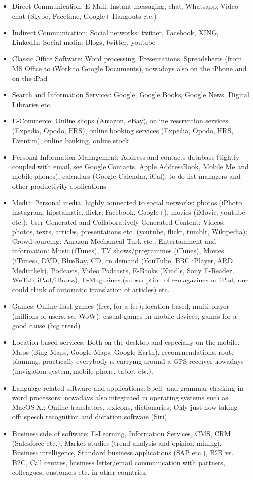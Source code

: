 \begin{multicols}{2}
\begin{itemize}
\item Direct Communication: E-Mail; Instant messaging, chat, Whatsapp; Video chat (Skype, Facetime, Google+ Hangouts etc.)
\item Indirect Communication: Social networks: twitter, Facebook, XING, LinkedIn; Social media: Blogs, twitter, youtube
\item Classic Office Software: Word processing, Presentations, Spreadsheets (from MS Office to iWork to Google Documents), nowadays also on the iPhone and on the iPad
\item Search and Information Services: Google, Google Books, Google News, Digital Libraries etc.
\item E-Commerce: Online shops (Amazon, eBay), online reservation services (Expedia, Opodo, HRS), online booking services (Expedia, Opodo, HRS, Eventim), online banking, online stock
\item Personal Information Management: Address and contacts database (tightly coupled with email, see Google Contacts, Apple AddressBook, Mobile Me and mobile phones), calendars (Google Calendar, iCal), to do list managers and other productivity applications
\item Media: Personal media, highly connected to social networks: photos (iPhoto, instagram, hipstamatic, flickr, Facebook, Google+), movies (iMovie, youtube etc.); User Generated and Collaboratively Generated Content: Videos, photos, texts, articles, presentations etc. (youtube, flickr, tumblr, Wikipedia); Crowd sourcing: Amazon Mechanical Turk etc.; Entertainment and information: Music (iTunes), TV shows/programmes (iTunes), Movies (iTunes), DVD, BlueRay, CD, on demand (YouTube, BBC iPlayer, ARD Mediathek), Podcasts, Video Podcasts, E-Books (Kindle, Sony E-Reader, WeTab, iPad/iBooks), E-Magazines (subscription of e-magazines on iPad; one could think of automatic translation of articles) etc.
\item Games: Online flash games (free, for a fee); location-based; multi-player (millions of users, see WoW); casual games on mobile devices; games for a good cause (big trend)
\item Location-based services: Both on the desktop and especially on the mobile: Maps (Bing Maps, Google Maps, Google Earth), recommendations, route planning; practically everybody is carrying around a GPS receiver nowadays (navigation system, mobile phone, tablet etc.).
\item Language-related software and applications: Spell- and grammar checking in word processors; nowadays also integrated in operating systems such as MacOS X.; Online translators, lexicons, dictionaries; Only just now taking off: speech recognition and dictation software (Siri).
\item Business side of software: E-Learning, Information Services, CMS, CRM (Salesforce etc.), Market studies (trend analysis and opinion mining), Business intelligence, Standard business applications (SAP etc.), B2B vs. B2C, Call centres, business letter/email communication with partners, colleagues, customers etc. in other countries.
\end{itemize}


\end{multicols}
